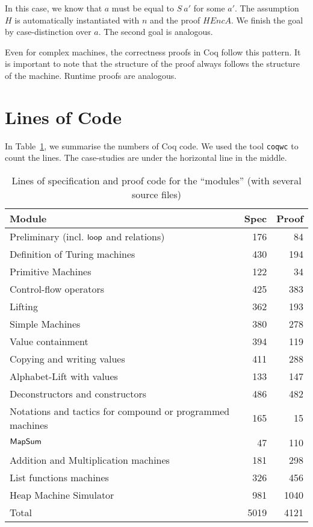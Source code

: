 In this case, we know that $a$ must be equal to $S~a'$ for some $a'$.  The assumption $H$ is automatically instantiated with $n$ and the proof
$HEncA$.  We finish the goal by case-distinction over $a$.  The second goal is analogous.


Even for complex machines, the correctness proofs in Coq follow this pattern.  It is important to note that the structure of the proof always follows
the structure of the machine.  Runtime proofs are analogous.


\section*{Lines of Code}
\label{sec:coq-lines}

In Table~\ref{tab:coq-lines}, we summarise the numbers of Coq code.  We used the tool \texttt{coqwc} to count the lines.  The case-studies are under
the horizontal line in the middle.
\begin{table}[h]
  \centering
  \begin{tabular}{p{6.5cm}|r|r}
    Module                                    & Spec & Proof\\ \hline
    Preliminary (incl. $\mathsf{loop}$ and relations) &  176 &   84 \\
    Definition of Turing machines             &  430 &  194 \\
    Primitive Machines                        &  122 &   34 \\
    Control-flow operators                    &  425 &  383 \\
    Lifting                                   &  362 &  193 \\
    Simple Machines                           &  380 &  278 \\
    Value containment                         &  394 &  119 \\
    Copying and writing values                &  411 &  288 \\
    Alphabet-Lift with values                 &  133 &  147 \\
    Deconstructors and constructors           &  486 &  482 \\
    Notations and tactics for compound
    or programmed machines                    &  165 &   15 \\  \hline
    $\mathsf{MapSum}$                             &   47 &  110 \\
    Addition and Multiplication machines      &  181 &  298 \\
    List functions machines                   &  326 &  456 \\
    Heap Machine Simulator                    &  981 & 1040 \\ \hline\hline
    Total                                     & 5019 & 4121 \\
  \end{tabular}
  \caption{Lines of specification and proof code for the ``modules'' (with several source files)}
  \label{tab:coq-lines}
\end{table}

